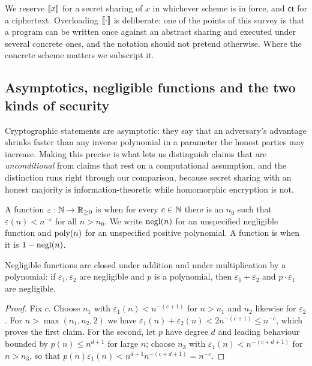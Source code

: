 We reserve $[\![x]\!]$ for a secret sharing of $x$ in whichever scheme is in force,
and $\mathsf{ct}$ for a ciphertext. Overloading $[\![\cdot]\!]$ is deliberate: one
of the points of this survey is that a program can be written once against an
abstract sharing and executed under several concrete ones, and the notation
should not pretend otherwise. Where the concrete scheme matters we subscript it.

\subsection{Asymptotics, negligible functions and the two kinds of security}
\label{sec:math:negl}

Cryptographic statements are asymptotic: they say that an adversary's advantage
shrinks faster than any inverse polynomial in a parameter the honest parties may
increase. Making this precise is what lets us distinguish claims that are
\emph{unconditional} from claims that rest on a computational assumption, and the
distinction runs right through our comparison, because secret sharing with an
honest majority is information-theoretic while homomorphic encryption is not.

\begin{definition}
\label{def:negl}
A function $\varepsilon : \mathbb{N} \to \mathbb{R}_{\ge 0}$ is  when for every
$c \in \mathbb{N}$ there is an $n_0$ such that $\varepsilon(n) < n^{-c}$ for all
$n > n_0$. We write $\mathrm{negl}(n)$ for an unspecified negligible function and
$\mathrm{poly}(n)$ for an unspecified positive polynomial. A function is
 when it is $1 - \mathrm{negl}(n)$.
\end{definition}

\begin{proposition}
\label{prop:negl-closure}
Negligible functions are closed under addition and under multiplication by a
polynomial: if $\varepsilon_1,\varepsilon_2$ are negligible and $p$ is a
polynomial, then $\varepsilon_1 + \varepsilon_2$ and $p \cdot \varepsilon_1$ are
negligible.
\end{proposition}

\begin{proof}
Fix $c$. Choose $n_1$ with $\varepsilon_1(n) < n^{-(c+1)}$ for $n > n_1$ and
$n_2$ likewise for $\varepsilon_2$. For $n > \max(n_1,n_2,2)$ we have
$\varepsilon_1(n)+\varepsilon_2(n) < 2n^{-(c+1)} \le n^{-c}$, which proves the
first claim. For the second, let $p$ have degree $d$ and leading behaviour
bounded by $p(n) \le n^{d+1}$ for large $n$; choose $n_3$ with
$\varepsilon_1(n) < n^{-(c+d+1)}$ for $n > n_3$, so that
$p(n)\varepsilon_1(n) < n^{d+1}n^{-(c+d+1)} = n^{-c}$.
\end{proof}

